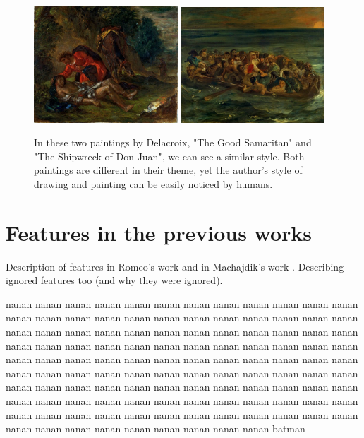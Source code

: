 \documentclass[11pt,a4paper]{report}
\begin{document}
\begin{multicols}{2}
\begin{figure}[tb]
\centering
\includegraphics[width=0.48\textwidth]{sim_delacroix_samaritan}
\includegraphics[width=0.48\textwidth]{sim_delacroix_shipwreck}
\caption[Example of similar styles]{In these two paintings by Delacroix, "The
Good Samaritan" and "The Shipwreck of Don Juan", we can see a similar style.
Both paintings are different in their theme, yet the author's style of drawing
and painting can be easily noticed by humans.}
\label{similar}
\end{figure}

\section{Features in the previous works}

Description of features in Romeo's work \cite{rmc12ajs} and in Machajdik's work
\cite{mach10clas}.  Describing ignored features too (and why they were
ignored).

nanan nanan nanan nanan nanan nanan nanan nanan nanan nanan nanan nanan nanan
nanan nanan nanan nanan nanan nanan nanan nanan nanan nanan nanan nanan nanan
nanan nanan nanan nanan nanan nanan nanan nanan nanan nanan nanan nanan nanan
nanan nanan nanan nanan nanan nanan nanan nanan nanan nanan nanan nanan nanan
nanan nanan nanan nanan nanan nanan nanan nanan nanan nanan nanan nanan nanan
nanan nanan nanan nanan nanan nanan nanan nanan nanan nanan nanan nanan nanan
nanan nanan nanan nanan nanan nanan nanan nanan nanan nanan nanan nanan nanan
nanan nanan nanan nanan nanan nanan nanan nanan nanan nanan nanan nanan nanan
nanan nanan nanan nanan nanan nanan nanan nanan nanan nanan nanan nanan nanan
batman

\end{multicols}
\end{document}
